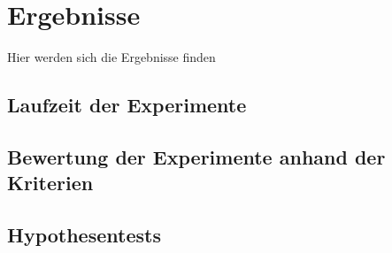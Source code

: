 \chapter{Ergebnisse}
\label{chapter:Ergebnisse}
Hier werden sich die Ergebnisse finden
\section{Laufzeit der Experimente}
\section{Bewertung der Experimente anhand der Kriterien}
\section{Hypothesentests}